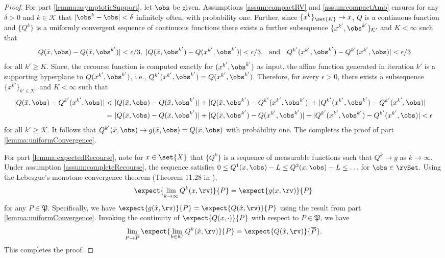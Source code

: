 \documentclass[11pt]{article}
\newcommand{\frakP}{\mathfrak{P}}
\begin{document}
\begin{proof}
For part \ref{lemma:asymptoticSupport}, let $\obs$ be given. Assumptions \ref{assum:compactRV} and \ref{assum:compactAmb} ensures for any $\delta > 0$ and $k \in \mathcal{K}$ that $|\obs^k - \obs| < \delta$ infinitely often, with probability one. Further, since $\{x^k\}_{\set{K}} \rightarrow \bar{x}$, $Q$ is a continuous function and $\{Q^k\}$ is a uniformly convergent sequence of continuous functions there exists a further subsequence $\{x^{k'},\obs^{k'}\}_{\mathcal{K}'}$ and $K < \infty$ such that  
\begin{align*}
    |Q(\bar{x},\obs) - Q(\bar{x},\obs^{k'})| <\epsilon/3, \     
    |Q(\bar{x},\obs^{k'}) - Q(x^{k'},\obs^{k'})| <\epsilon/3, \ \text{ and } \    
    |Q^{k'}(x^{k'},\obs^{k'}) - Q^{k'}(x^{k'},\obs)| <\epsilon/3
\end{align*}
for all $k' \geq K$. Since, the recourse function is computed exactly for $(x^{k'}, \obs^{k'})$ as input, the affine function generated in iteration $k'$ is a supporting hyperplane to $Q(x^{k'}, \obs^{k'})$, i.e., $Q^{k'}(x^{k'}, \obs^{k'}) = Q(x^{k'}, \obs^{k'})$. Therefore, for every $\epsilon >0$, there exists a subsequence $\{x^{k'}\}_{k' \in \mathcal{K}'}$ and $K < \infty$ such that
\begin{align*}
     |Q(\bar{x},\obs) - Q^{k'}(x^{k'},\obs)|
     < & \ | Q(\bar{x}, \obs) - Q(\bar{x},\obs^{k'})| + |Q(\bar{x},\obs^{k'}) - Q^{k'}(x^{k'},\obs^{k'})| + |Q^{k'}(x^{k'},\obs^{k'}) - Q^{k'}(x^{k'},\obs)| \\
     = & \ | Q(\bar{x}, \obs) - Q(\bar{x},\obs^{k'})| + |Q(\bar{x},\obs^{k'}) - Q(x^{k'},\obs^{k'})| + |Q^{k'}(x^{k'},\obs^{k'}) - Q^{k'}(x^{k'},\obs)| < \epsilon
\end{align*}
for all $k' \geq \mathcal{K}$. It follows that $Q^{k'}(\bar{x},\obs) \rightarrow g(\bar{x},\obs) = Q(\overline{x},\obs)$ with probability one. The completes the proof of part \ref{lemma:uniformConvergence}.

For part \ref{lemma:expectedRecourse}, note for $x \in \set{X}$ that $\{Q^k\}$ is a sequence of measurable functions such that $Q^k \rightarrow g$ as $k \rightarrow \infty$. Under assumption \ref{assum:completeRecourse}, the sequence satisfies $0 \leq Q^1(x,\obs) - L \leq Q^2(x,\obs) - L \leq \ldots$ for $\obs \in \rvSet$. Using the Lebesgue's monotone convergence theorem (Theorem 11.28 in \cite{Rudin1976}), \begin{align*}
    \expect{\lim_{k \rightarrow \infty} Q^k(x,\rv)}{P} = \expect{g(x,\rv)}{P}
\end{align*}
for any $P \in \mathfrak{P}$. Specifically, we have $\expect{g(\hat{x},\rv)}{P} = \expect{Q(\hat{x},\rv)}{P}$ using the result from part \ref{lemma:uniformConvergence}. Invoking the continuity of $\expect{Q(x,\cdot)}{P}$ with respect to $P \in \frakP$, we have
\begin{align*}
    \lim_{P \rightarrow \overline{P}} \expect{\lim_{k \in \mathcal{K}'} Q^k(\hat{x},\rv)}{P} = \expect{Q(\hat{x},\rv)}{\overline{P}}.
\end{align*}
This completes the proof.
\end{proof}
\end{document}
